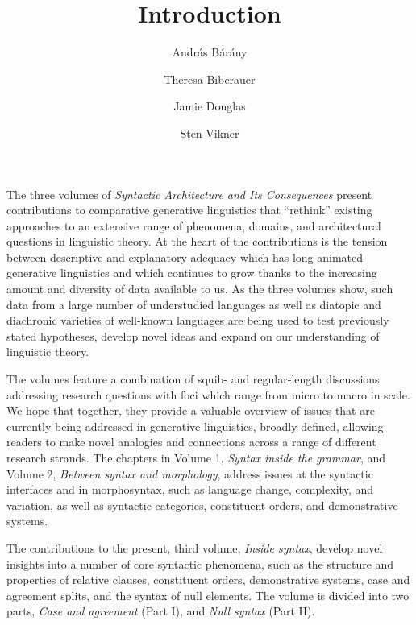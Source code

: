 \documentclass[output=paper]{langsci/langscibook}
\author{András Bárány\affiliation{Bielefeld University}\and
        Theresa Biberauer\affiliation{University of Cambridge, Stellenbosch
        University, University of the West Cape}\and
        Jamie Douglas\and
        Sten Vikner\affiliation{Aarhus University}}
\title{Introduction}
\begin{document}
\noindent The three volumes of \emph{Syntactic Architecture and Its
Consequences} present contributions to comparative generative linguistics that
\enquote{rethink} existing approaches to an extensive range of phenomena,
domains, and architectural questions in linguistic theory. At the heart of the
contributions is the tension between descriptive and explanatory adequacy which
has long animated generative linguistics and which continues to grow thanks to
the increasing amount and diversity of data available to us. As the three
volumes show, such data from a large number of understudied languages as well
as diatopic and diachronic varieties of well-known languages are being used to
test previously stated hypotheses, develop novel ideas and expand on our
understanding of linguistic theory.

The volumes feature a combination of squib- and regular-length discussions
addressing research questions with foci which range from micro to macro in
scale. We hope that together, they provide a valuable overview of issues that
are currently being addressed in generative linguistics, broadly defined,
allowing readers to make novel analogies and connections across a range of
different research strands. The chapters in Volume 1, \emph{Syntax inside the
grammar}, and Volume 2, \emph{Between syntax and morphology}, address issues at
the syntactic interfaces and in morphosyntax, such as language change,
complexity, and variation, as well as syntactic categories, constituent orders,
and demonstrative systems.

The contributions to the present, third volume, \emph{Inside syntax}, develop
novel insights into a number of core syntactic phenomena, such as the structure
and properties of relative clauses, constituent orders, demonstrative systems,
case and agreement splits, and the syntax of null elements. The volume is
divided into two parts, \emph{Case and agreement} (Part I), and \emph{Null
syntax} (Part II).
\end{document}
